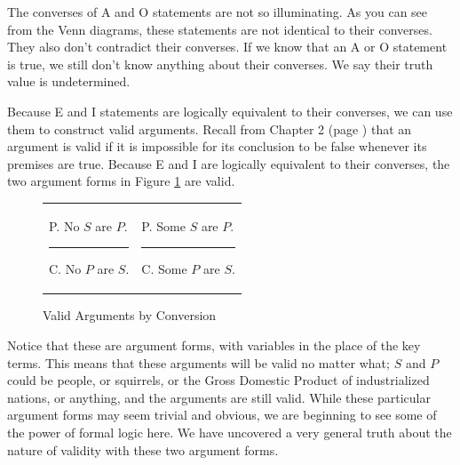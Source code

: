 The converses of A and O statements are not so illuminating. As you can see from the Venn diagrams, these statements are not identical to their converses. They also don't contradict their converses. If we know that an A or O statement is true, we still don't know anything about their converses. We say their truth value is undetermined.

Because E and I statements are logically equivalent to their converses, we can use them to construct valid arguments. Recall from Chapter 2 (page \pageref{def:valid}) that an argument is valid if it is impossible for its conclusion to be false whenever its premises are true. Because E and I are logically equivalent to their converses, the two argument forms in Figure \ref{fig:conversion_arguments} are valid.


\begin{figure}
\begin{mdframed}[style=mytablebox]
\begin{tabu}{p{.5\linewidth}p{.5\linewidth}}

\begin{earg}
\item[P.] No $S$ are $P$.
\vspace{-.5em}
\item [] \rule{0.6\linewidth}{1pt}
\item[C.] No $P$ are $S$.
\end{earg}

&

\begin{earg}
\item[P.] Some $S$ are $P$.
\vspace{-.5em}
\item [] \rule{0.6\linewidth}{1pt}
\item[C.] Some  $P$ are $S$.
\end{earg}
\end{tabu}
\end{mdframed}
\caption{Valid Arguments by Conversion} \label{fig:conversion_arguments}
\end{figure}

Notice that these are argument forms, with variables in the place of the key terms. This means that these arguments will be valid no matter what; $S$ and $P$ could be people, or squirrels, or the Gross Domestic Product of industrialized nations, or anything, and the arguments are still valid. While these particular argument forms may seem trivial and obvious, we are beginning to see some of the power of formal logic here. We have uncovered a very general truth about the nature of validity with these two argument forms.


